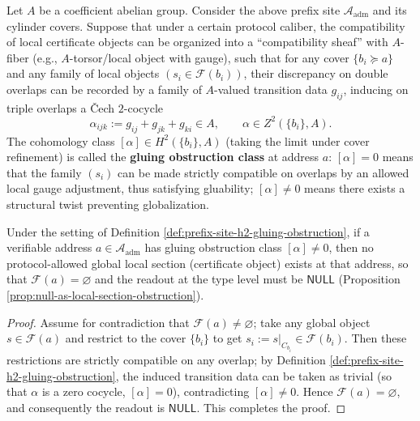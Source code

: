 \begin{definition}\label{def:prefix-site-h2-gluing-obstruction}
Let \(A\) be a coefficient abelian group.
Consider the above prefix site \(\mathcal{A}_{\mathrm{adm}}\) and its cylinder covers.
Suppose that under a certain protocol caliber, the compatibility of local certificate objects can be organized into a ``compatibility sheaf'' with \(A\)-fiber (e.g., \(A\)-torsor/local object with gauge), such that for any cover \(\{b_i\succeq a\}\) and any family of local objects \((s_i\in\mathscr{F}(b_i))\), their discrepancy on double overlaps can be recorded by a family of \(A\)-valued transition data \(g_{ij}\), inducing on triple overlaps a \v{C}ech \(2\)-cocycle
\[
\alpha_{ijk}:=g_{ij}+g_{jk}+g_{ki}\in A,
\qquad
\alpha\in Z^2(\{b_i\},A).
\]
The cohomology class \([\alpha]\in H^2(\{b_i\},A)\) (taking the limit under cover refinement) is called the \textbf{gluing obstruction class} at address \(a\): \([\alpha]=0\) means that the family \((s_i)\) can be made strictly compatible on overlaps by an allowed local gauge adjustment, thus satisfying gluability; \([\alpha]\neq 0\) means there exists a structural twist preventing globalization.
\end{definition}

\begin{proposition}\label{prop:null-as-h2-obstruction}
Under the setting of Definition \ref{def:prefix-site-h2-gluing-obstruction},
if a verifiable address \(a\in\mathcal{A}_{\mathrm{adm}}\) has gluing obstruction class \([\alpha]\neq 0\),
then no protocol-allowed global local section (certificate object) exists at that address, so that
\(
\mathscr{F}(a)=\varnothing
\)
and the readout at the type level must be \(\mathsf{NULL}\) (Proposition \ref{prop:null-as-local-section-obstruction}).
\end{proposition}

\begin{proof}
Assume for contradiction that \(\mathscr{F}(a)\neq\varnothing\); take any global object \(s\in\mathscr{F}(a)\) and restrict to the cover \(\{b_i\}\) to get \(s_i:=s|_{C_{b_i}}\in\mathscr{F}(b_i)\).
Then these restrictions are strictly compatible on any overlap; by Definition \ref{def:prefix-site-h2-gluing-obstruction}, the induced transition data can be taken as trivial (so that \(\alpha\) is a zero cocycle, \([\alpha]=0\)), contradicting \([\alpha]\neq 0\).
Hence \(\mathscr{F}(a)=\varnothing\), and consequently the readout is \(\mathsf{NULL}\).
This completes the proof.
\end{proof}
